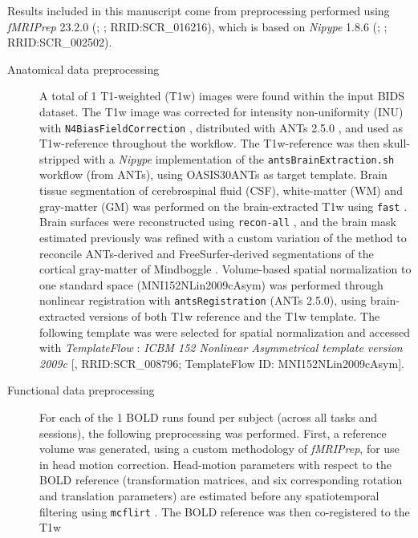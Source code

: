 \documentclass[
]{article}
\author{}
\date{}
\begin{document}
Results included in this manuscript come from preprocessing performed
using \emph{fMRIPrep} 23.2.0 (\citet{fmriprep1}; \citet{fmriprep2};
RRID:SCR\_016216), which is based on \emph{Nipype} 1.8.6
(\citet{nipype1}; \citet{nipype2}; RRID:SCR\_002502).

\begin{description}
\item[Anatomical data preprocessing]
A total of 1 T1-weighted (T1w) images were found within the input BIDS
dataset. The T1w image was corrected for intensity non-uniformity (INU)
with \texttt{N4BiasFieldCorrection} \citep{n4}, distributed with ANTs
2.5.0 \citep[RRID:SCR\_004757]{ants}, and used as T1w-reference
throughout the workflow. The T1w-reference was then skull-stripped with
a \emph{Nipype} implementation of the \texttt{antsBrainExtraction.sh}
workflow (from ANTs), using OASIS30ANTs as target template. Brain tissue
segmentation of cerebrospinal fluid (CSF), white-matter (WM) and
gray-matter (GM) was performed on the brain-extracted T1w using
\texttt{fast} \citep[FSL (version unknown),
RRID:SCR\_002823,][]{fsl_fast}. Brain surfaces were reconstructed using
\texttt{recon-all} \citep[FreeSurfer 7.3.2,
RRID:SCR\_001847,][]{fs_reconall}, and the brain mask estimated
previously was refined with a custom variation of the method to
reconcile ANTs-derived and FreeSurfer-derived segmentations of the
cortical gray-matter of Mindboggle
\citep[RRID:SCR\_002438,][]{mindboggle}. Volume-based spatial
normalization to one standard space (MNI152NLin2009cAsym) was performed
through nonlinear registration with \texttt{antsRegistration} (ANTs
2.5.0), using brain-extracted versions of both T1w reference and the T1w
template. The following template was were selected for spatial
normalization and accessed with \emph{TemplateFlow}
\citep[23.1.0,][]{templateflow}: \emph{ICBM 152 Nonlinear Asymmetrical
template version 2009c} {[}\citet{mni152nlin2009casym},
RRID:SCR\_008796; TemplateFlow ID: MNI152NLin2009cAsym{]}.
\item[Functional data preprocessing]
For each of the 1 BOLD runs found per subject (across all tasks and
sessions), the following preprocessing was performed. First, a reference
volume was generated, using a custom methodology of \emph{fMRIPrep}, for
use in head motion correction. Head-motion parameters with respect to
the BOLD reference (transformation matrices, and six corresponding
rotation and translation parameters) are estimated before any
spatiotemporal filtering using \texttt{mcflirt} \citep[FSL
,][]{mcflirt}. The BOLD reference was then co-registered to the T1w

\end{description}
\end{document}
